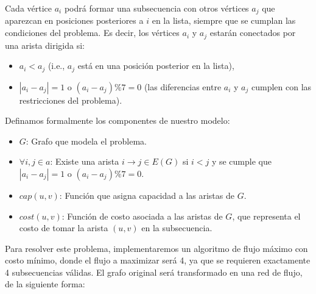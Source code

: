 \documentclass{article}
\begin{document}
Cada vértice $a_i$ podrá formar una subsecuencia con otros vértices $a_j$ que aparezcan en posiciones posteriores a $i$ en la lista, siempre que se cumplan las condiciones del problema. Es decir, los vértices $a_i$ y $a_j$ estarán conectados por una arista dirigida si:

\begin{itemize}
    \item $a_i < a_j$ (i.e., $a_j$ está en una posición posterior en la lista),
    \item $|a_i - a_j| = 1$ o $(a_i - a_j) \% 7 = 0$ (las diferencias entre $a_i$ y $a_j$ cumplen con las restricciones del problema).
\end{itemize}

Definamos formalmente los componentes de nuestro modelo:

\begin{itemize}
    \item $G$: Grafo que modela el problema.
    \item $\forall i,j \in a$: Existe una arista $i \rightarrow j \in E(G)$ si $i < j$ y se cumple que $|a_i - a_j| = 1$ o $(a_i - a_j) \% 7 = 0$.
    \item $cap(u,v)$: Función que asigna capacidad a las aristas de $G$.
    \item $cost(u,v)$: Función de costo asociada a las aristas de $G$, que representa el costo de tomar la arista $(u,v)$ en la subsecuencia.
\end{itemize}

Para resolver este problema, implementaremos un algoritmo de flujo máximo con costo mínimo, donde el flujo a maximizar será 4, ya que se requieren exactamente 4 subsecuencias válidas. El grafo original será transformado en una red de flujo, de la siguiente forma:
\end{document}
